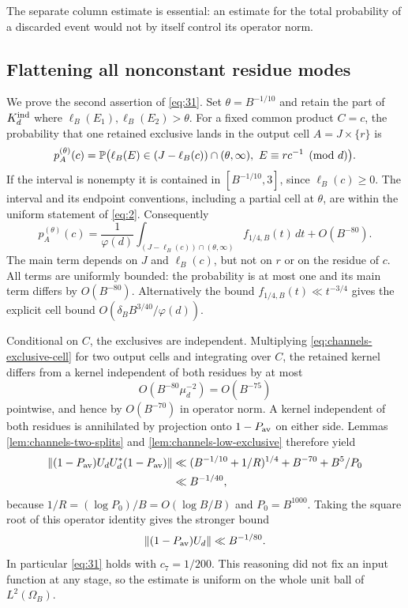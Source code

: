 The separate column estimate is essential: an estimate for the total
probability of a discarded event would not by itself control its
operator norm.

\subsection{Flattening all nonconstant residue modes}

We prove the second assertion of \eqref{eq:31}.
Set \(\theta=B^{-1/10}\) and retain the part of \(K_d^{\rm ind}\) where
\(\ell_B(E_1),\ell_B(E_2)>\theta\).
For a fixed common product \(C=c\), the probability that one retained
exclusive lands in the output cell \(A=J\times\{r\}\) is
\[
 p_A^{(\theta)}(c)
 =\mathbb P\bigl(\ell_B(E)\in(J-\ell_B(c))\cap(\theta,\infty),\
                   E\equiv rc^{-1}\pmod d\bigr).
\]
If the interval is nonempty it is contained in
\([B^{-1/10},3]\), since \(\ell_B(c)\ge0\).  The interval and its endpoint
conventions, including a partial cell at \(\theta\), are within the
uniform statement of \eqref{eq:2}.  Consequently
\begin{equation}\label{eq:channels-exclusive-cell}
 p_A^{(\theta)}(c)
 =\frac1{\varphi(d)}
   \int_{(J-\ell_B(c))\cap(\theta,\infty)}f_{1/4,B}(t)\,dt
   +O(B^{-80}).
\end{equation}
The main term depends on \(J\) and \(\ell_B(c)\), but not on \(r\) or
on the residue of \(c\).  All terms are uniformly bounded: the
probability is at most one and its main term differs by \(O(B^{-80})\).
Alternatively the bound \(f_{1/4,B}(t)\ll t^{-3/4}\) gives the explicit
cell bound \(O(\delta_B B^{3/40}/\varphi(d))\).

Conditional on \(C\), the exclusives are independent.  Multiplying
\eqref{eq:channels-exclusive-cell} for two output cells and integrating
over \(C\), the retained kernel differs from a kernel independent of
both residues by at most
\[
 O(B^{-80}\mu_d^{-2})=O(B^{-75})
\]
pointwise, and hence by \(O(B^{-70})\) in operator norm.
A kernel independent of both residues is annihilated by projection
onto \(1-P_{\rm av}\) on either side.  Lemmas
\ref{lem:channels-two-splits} and \ref{lem:channels-low-exclusive}
therefore yield
\[
 \begin{split}
 \|(1-P_{\rm av})U_dU_d^*(1-P_{\rm av})\|
 &\ll (B^{-1/10}+1/R)^{1/4}
          +B^{-70}+B^5/P_0\\
 &\ll B^{-1/40},
 \end{split}
\]
because \(1/R=(\log P_0)/B=O(\log B/B)\) and \(P_0=B^{1000}\).
Taking the square root of this operator identity gives the stronger bound
\[
 \|(1-P_{\rm av})U_d\|\ll B^{-1/80}.
\]
In particular \eqref{eq:31} holds with \(c_7=1/200\).
This reasoning did not fix an input function at any stage, so the
estimate is uniform on the whole unit ball of \(L^2(\Omega_B)\).

